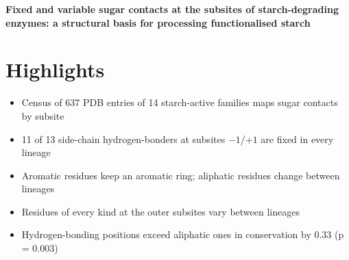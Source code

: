 \documentclass[12pt]{article}
\begin{document}
\noindent\textbf{Fixed and variable sugar contacts at the subsites of starch-degrading enzymes: a structural basis for processing functionalised starch}

\section*{Highlights}
\begin{itemize}
  \item Census of 637 PDB entries of 14 starch-active families maps sugar contacts by subsite
  \item 11 of 13 side-chain hydrogen-bonders at subsites $-1$/$+1$ are fixed in every lineage
  \item Aromatic residues keep an aromatic ring; aliphatic residues change between lineages
  \item Residues of every kind at the outer subsites vary between lineages
  \item Hydrogen-bonding positions exceed aliphatic ones in conservation by 0.33 (p = 0.003)
\end{itemize}
\end{document}

